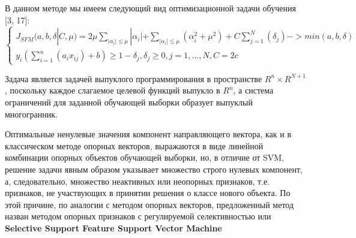\documentclass[../body.tex]{subfiles}
\begin{document}
В данном методе мы имеем следующий вид оптимизационной задачи обучения [3, 17]:
$$\left\{\begin{matrix}
	J_{SFM}(a, b, \delta |C,\mu) = 2\mu\sum_{|\alpha_{i}|\leq\mu}|\alpha_{i}| + \sum_{|\alpha_{i}|\leq\mu}(\alpha_{i}^2 + \mu^2)+ C\sum_{j=1}^{N}(\delta_j)->min(a,b,\delta)
	\\
	y_i(\sum_{i=1}^{n}(a_ix_{ij})+b)\geq1-\delta_j, \delta_j \geq 0, j= 1,...,N, C=2c
\end{matrix}\right.$$

Задача является задачей выпуклого программирования в пространстве $R^n \times R^{N+1}$, поскольку каждое слагаемое целевой функций выпукло в $R^n$, а система ограничений для заданной обучающей выборки образует выпуклый многогранник.

Оптимальные ненулевые значения компонент направляющего вектора, как и в классическом методе опорных векторов, выражаются в виде линейной комбинации опорных объектов обучающей выборки, но, в отличие от SVM, решение задачи явным образом указывает множество строго нулевых компонент, а, следовательно, множество неактивных или неопорных признаков, т.е. признаков, не участвующих в принятии решения о классе нового объекта. По этой причине, по аналогии с методом опорных векторов, предложенный метод назван  методом опорных признаков
с регулируемой селективностью или \textbf{Selective Support Feature Support Vector Machine}
\end{document}
